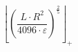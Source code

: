 \[\left\lfloor \left(\frac{L \cdot R^{2}}{4096 \cdot \varepsilon}\right)^{\frac{2}{5}} \right\rfloor_{+}\]

